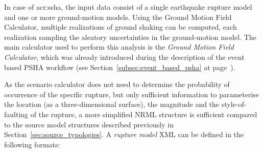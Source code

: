 In case of \gls{acr:ssha}, the input data consist of a single earthquake
rupture model and one or more ground-motion models. Using the Ground Motion
Field Calculator, multiple realizations of ground shaking can be computed,
each realization sampling the aleatory uncertainties in the ground-motion
model. The main calculator used to perform this analysis is the \emph{Ground
Motion Field Calculator}, which was already introduced during the description
of the event based PSHA workflow (see Section~\ref{subsec:event_based_psha} at
page~\pageref{subsec:event_based_psha}).

As the scenario calculator does not need to determine the probability of
occurrence of the specific rupture, but only sufficient information to
parameterise the location (as a three-dimensional surface), the magnitude and
the style-of-faulting of the rupture, a more simplified NRML structure is
sufficient compared to the source model structures described previously in
Section~\ref{sec:source_typologies}.
A \emph{rupture model} XML can be defined in the following formats:

